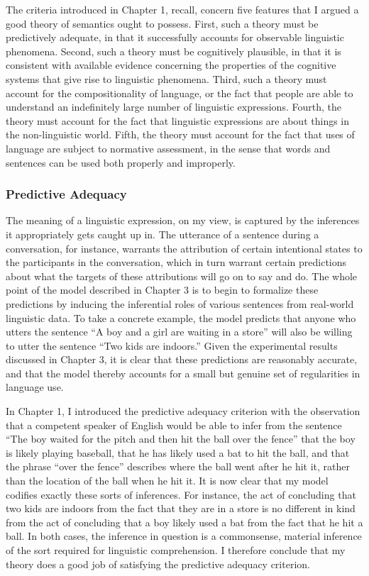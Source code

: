 The criteria introduced in Chapter 1, recall, concern five features that I argued a good theory of semantics ought to possess. First, such a theory must be predictively adequate, in that it successfully accounts for observable linguistic phenomena. Second, such a theory must be cognitively plausible, in that it is consistent with available evidence concerning the properties of the cognitive systems that give rise to linguistic phenomena. Third, such a theory must account for the compositionality of language, or the fact that people are able to understand an indefinitely large number of linguistic expressions. Fourth, the theory must account for the fact that linguistic expressions are about things in the non-linguistic world. Fifth, the theory must account for the fact that uses of language are subject to normative assessment, in the sense that words and sentences can be used both properly and improperly.

\subsubsection{Predictive Adequacy}

The meaning of a linguistic expression, on my view, is captured by the inferences it appropriately gets caught up in. The utterance of a sentence during a conversation, for instance, warrants the attribution of certain intentional states to the participants in the conversation, which in turn warrant certain predictions about what the targets of these attributions will go on to say and do. The whole point of the model described in Chapter 3 is to begin to formalize these predictions by inducing the inferential roles of various sentences from real-world linguistic data. To take a concrete example, the model predicts that anyone who utters the sentence ``A boy and a girl are waiting in a store'' will also be willing to utter the sentence ``Two kids are indoors.'' Given the experimental results discussed in Chapter 3, it is clear that these predictions are reasonably accurate, and that the model thereby accounts for a small but genuine set of regularities in language use. 

In Chapter 1, I introduced the predictive adequacy criterion with the observation that a competent speaker of English would be able to infer from the sentence ``The boy waited for the pitch and then hit the ball over the fence'' that the boy is likely playing baseball, that he has likely used a bat to hit the ball, and that the phrase ``over the fence'' describes where the ball went after he hit it, rather than the location of the ball when he hit it. It is now clear that my model codifies exactly these sorts of inferences. For instance, the act of concluding that two kids are indoors from the fact that they are in a store is no different in kind from the act of concluding that a boy likely used a bat from the fact that he hit a ball. In both cases, the inference in question is a commonsense, material inference of the sort required for linguistic comprehension. I therefore conclude that my theory does a good job of satisfying the predictive adequacy criterion. 

